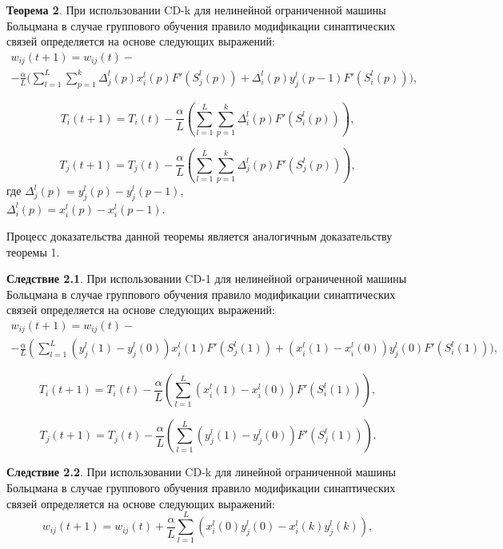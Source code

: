 \textbf{Теорема 2}. При использовании  CD-k для нелинейной ограниченной машины Больцмана в случае группового обучения правило модификации синаптических связей определяется на основе следующих выражений:
\begin{multline*}
    w_{ij}(t+1)=w_{ij}(t)-\\-\frac{\alpha}{L}\Bigg(\sum_{l=1}^L\sum_{p=1}^k\Delta_j^l(p)x_i^l(p)F'(S_j^l(p))+\Delta_i^l(p)y_j^l(p-1)F'(S_i^l(p))\Bigg),
\end{multline*}

\begin{equation*}
    T_{i}(t+1)=T_{i}(t)-\frac{\alpha}{L}\left(\sum_{l=1}^L\sum_{p=1}^k \Delta_i^l(p)F'(S_i^l(p))\right),
\end{equation*}

\begin{equation*}
    T_{j}(t+1)=T_{j}(t)-\frac{\alpha}{L}\left(\sum_{l=1}^L\sum_{p=1}^k \Delta_j^l(p)F'(S_j^l(p))\right),
\end{equation*}
где $\Delta_j^l(p) = y_j^l(p)-y_j^l(p-1)$,\\
$\Delta_i^l(p) = x_i^l(p)-x_i^l(p-1)$.

Процесс доказательства данной теоремы является аналогичным доказательству теоремы 1.

\textbf{Следствие 2.1}. При использовании  CD-1 для нелинейной ограниченной машины Больцмана в случае группового обучения правило модификации синаптических связей определяется на основе следующих выражений:
\begin{multline*}
    w_{ij}(t+1)=w_{ij}(t)-\\-\frac{\alpha}{L}\left(\sum_{l=1}^L (y_j^l(1)-y_j^l(0))x_i^l(1)F'(S_j^l(1))+(x_i^l(1)-x_i^l(0))y_j^l(0)F'(S_i^l(1))\Bigg)\right.,
\end{multline*}

\begin{equation*}
    T_i(t+1)=T_i(t)-\frac{\alpha}{L}\left(\sum_{l=1}^L (x_i^l(1)-x_i^l(0))F'(S_i^l(1))\right),
\end{equation*}

\begin{equation*}
    T_j(t+1)=T_j(t)-\frac{\alpha}{L}\left(\sum_{l=1}^L (y_j^l(1)-y_j^l(0))F'(S_j^l(1))\right).
\end{equation*}

\textbf{Следствие 2.2}. При использовании  CD-k для линейной ограниченной машины Больцмана в случае группового обучения правило модификации синаптических связей определяется на основе следующих выражений:
\begin{equation*}
    w_{ij}(t+1)=w_{ij}(t)+\frac{\alpha}{L}\sum_{l=1}^L (x_i^l(0)y_j^l(0)-x_i^l(k)y_j^l(k)),
\end{equation*}

